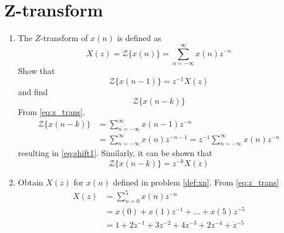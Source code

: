 \documentclass[journal,12pt,twocolumn]{IEEEtran}
\renewcommand\thesection{\arabic{section}}
\begin{document}
\section{Z-transform}
\begin{enumerate}[label=\thesection.\arabic*]
\item The $Z$-transform of $x(n)$ is defined as
%
\begin{equation}
\label{eq:z_trans}
X(z)={\mathcal {Z}}\{x(n)\}=\sum _{n=-\infty }^{\infty }x(n)z^{-n}
\end{equation}
%
Show that
\begin{equation}
\label{eq:shift1}
{\mathcal {Z}}\{x(n-1)\} = z^{-1}X(z)
\end{equation}
and find
\begin{equation}
	{\mathcal {Z}}\{x(n-k)\} 
\end{equation}
\solution From \eqref{eq:z_trans},
\begin{align}
{\mathcal {Z}}\{x(n-k)\} &=\sum _{n=-\infty }^{\infty }x(n-1)z^{-n}
\\
&=\sum _{n=-\infty }^{\infty }x(n)z^{-n-1} = z^{-1}\sum _{n=-\infty }^{\infty }x(n)z^{-n}
\end{align}
resulting in \eqref{eq:shift1}. Similarly, it can be shown that
%
\begin{equation}
\label{eq:z_trans_shift}
	{\mathcal {Z}}\{x(n-k)\} = z^{-k}X(z)
\end{equation}
\item Obtain $X(z)$ for $x(n)$ defined in problem 
	\ref{def:xn}.
\solution From \eqref{eq:z_trans}
\begin{align}
    X(z) &= \sum _{n=0 }^{5}x(n)z^{-n}\\
    &= x(0) + x(1)z^{-1} + \dots + x(5)z^{-5}\\
    &= 1 + 2z^{-1} + 3z^{-2} + 4z^{-3} + 2z^{-4} + z^{-5}
\end{align}


\end{enumerate}
\end{document}
